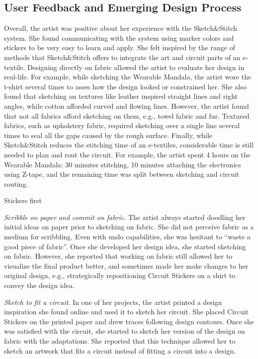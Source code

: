 \documentclass[header.tex]{subfiles}
\begin{document}
\subsection{User Feedback and Emerging Design Process}
Overall, the artist was positive about her experience with the Sketch\&Stitch system. She found communicating with the system using marker colors and stickers to be very easy to learn and apply. She felt inspired by the range of methods that Sketch\&Stitch offers to integrate the art and circuit parts of an e-textile. Designing directly on fabric allowed the artist to evaluate her design in real-life. For example, while sketching the Wearable Mandala, the artist wore the t-shirt several times to asses how the design looked or constrained her. She also found that sketching on textures like leather inspired straight lines and right angles, while cotton afforded curved and flowing lines. However, the artist found that not all fabrics afford sketching on them, e.g., towel fabric and fur. Textured fabrics, such as upholstery fabric, required sketching over a single line several times to seal all the gaps caused by the rough surface. Finally, while Sketch\&Stitch reduces the stitching time of an e-textiles, considerable time is still needed to plan and rout the circuit. For example, the artist spent 4 hours on the Wearable Mandala: 30 minutes stitching, 10 minutes attaching the electronics using Z-tape, and the remaining time was split between sketching and circuit routing.

Stickers first


\textit{Scribble on paper and commit on fabric}. The artist always started doodling her initial ideas on paper prior to sketching on fabric. She did not perceive fabric as a medium for scribbling. Even with undo capabilities, she was hesitant to ``waste a good piece of fabric''. 
Once she developed her design idea, she started sketching on fabric. However, she reported that working on fabric still allowed her to visualize the final product better, and sometimes made her make changes to her original design, e.g., strategically repositioning Circuit Stickers on a shirt to convey the design idea.

\textit{Sketch to fit a circuit.} In one of her projects, the artist printed a design inspiration she found online and used it to sketch her circuit. She placed Circuit Stickers on the printed paper and drew traces following design contours. Once she was satisfied with the circuit, she started to sketch her version of the design on fabric with the adaptations. She reported that this technique allowed her to sketch an artwork that fits a circuit instead of fitting a circuit into a design.
\end{document}
